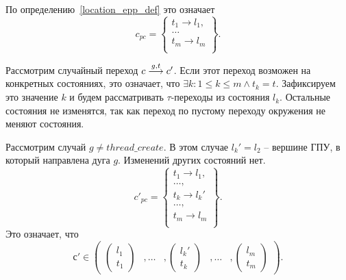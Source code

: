 \begin{enumerate}
По определению~\ref{location_epp_def} это означает 
$$ c_{pc} = 
\left\lbrace
\begin{array}{c}
t_1 \to l_1,\\
\dots\\
t_m \to l_m\\
\end{array}
\right\rbrace.$$

Рассмотрим случайный переход $c \stackrel{g,t}{\longrightarrow} c'$. Если этот переход возможен на конкретных состояниях, это означает, что $\exists k : 1 \le k \le m \land t_k = t$. Зафиксируем это значение $k$ и будем рассматривать $\tau$-переходы из состояния $l_k$. Остальные состояния не изменятся, так как переход по пустому переходу окружения не меняют состояния.

Рассмотрим случай $g \neq thread\_create$. В этом случае $l_k' = l_2$ -- вершине ГПУ, в который направлена дуга $g$. Изменений других состояний нет. $$ c'_{pc} = 
\left\lbrace
\begin{array}{c}
t_1 \to l_1,\\
\dots,\\
t_k \to l_k'\\
\dots,\\
t_m \to l_m\\
\end{array}
\right\rbrace.$$ Это означает, что $$с' \in \begin{pmatrix}
\begin{pmatrix}
l_1 \\
t_1 
\end{pmatrix}& ,
\dots& ,
\begin{pmatrix}
l_k' \\
t_k 
\end{pmatrix}& ,
\dots& ,
\begin{pmatrix}
l_m \\
t_m 
\end{pmatrix}
\end{pmatrix}.$$


\end{enumerate}
